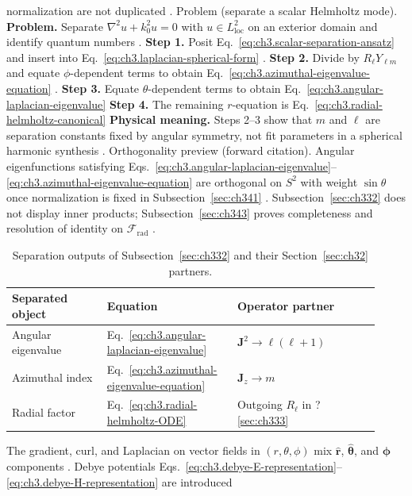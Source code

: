 normalization are not duplicated .
Problem (separate a scalar Helmholtz mode). \textbf{Problem.} Separate \(\nabla^{2}u+k_{0}^{2}u=0\) with \(u\in L^{2}_{\mathrm{loc}}\) on an exterior
domain and identify quantum numbers .
\textbf{Step 1.} Posit Eq.~\eqref{eq:ch3.scalar-separation-ansatz} and insert into
Eq.~\eqref{eq:ch3.laplacian-spherical-form} .
\textbf{Step 2.} Divide by \(R_{\ell}Y_{\ell m}\) and equate \(\phi\)-dependent terms to obtain
Eq.~\eqref{eq:ch3.azimuthal-eigenvalue-equation} .
\textbf{Step 3.} Equate \(\theta\)-dependent terms to obtain Eq.~\eqref{eq:ch3.angular-laplacian-eigenvalue}
\textbf{Step 4.} The remaining \(r\)-equation is Eq.~\eqref{eq:ch3.radial-helmholtz-canonical}
\textbf{Physical meaning.} Steps 2--3 show that \(m\) and \(\ell\) are separation constants fixed by angular
symmetry, not fit parameters in a spherical harmonic synthesis .
Orthogonality preview (forward citation). Angular eigenfunctions satisfying Eqs.~\eqref{eq:ch3.angular-laplacian-eigenvalue}--\eqref{eq:ch3.azimuthal-eigenvalue-equation}
are orthogonal on \(S^{2}\) with weight \(\sin\theta\) once normalization is fixed in Subsection~\ref{sec:ch341}
. Subsection~\ref{sec:ch332} does not display inner products; Subsection~\ref{sec:ch343}
proves completeness and resolution of identity on \(\mathcal{F}_{\mathrm{rad}}\) .
\begin{table}[t]
\centering
\caption{Separation outputs of Subsection~\ref{sec:ch332} and their Section~\ref{sec:ch32} partners.}
\label{tab:ch3.332-separation-alignment}
\small
\begin{tabular}{@{}p{0.24\linewidth}p{0.32\linewidth}p{0.36\linewidth}@{}}
\toprule
Separated object & Equation & Operator partner \\
\midrule
Angular eigenvalue &
Eq.~\eqref{eq:ch3.angular-laplacian-eigenvalue} &
\(\mathbf{J}^{2}\to\ell(\ell+1)\) \\
\addlinespace
Azimuthal index &
Eq.~\eqref{eq:ch3.azimuthal-eigenvalue-equation} &
\(\mathbf{J}_{z}\to m\) \\
\addlinespace
Radial factor &
Eq.~\eqref{eq:ch3.radial-helmholtz-ODE} &
Outgoing \(R_{\ell}\) in ?\ref{sec:ch333} \\
\bottomrule
\end{tabular}
\end{table}
The gradient, curl, and Laplacian on vector fields in \((r,\theta,\phi)\) mix \(\hat{\mathbf{r}}\),
\(\hat{\boldsymbol{\theta}}\), and \(\hat{\boldsymbol{\phi}}\) components . Debye
potentials Eqs.~\eqref{eq:ch3.debye-E-representation}--\eqref{eq:ch3.debye-H-representation} are introduced
